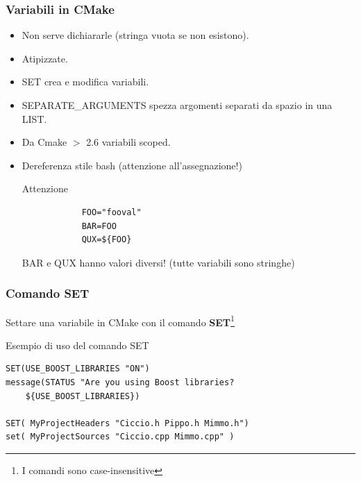 \documentclass[10pt] {beamer}
\begin{document}
\begin{frame}[fragile]
	\frametitle{Variabili in CMake}
	\begin{itemize}
		\item Non serve dichiararle (stringa vuota se non esistono).
		\item Atipizzate.
		\item SET crea e modifica variabili.
		\item SEPARATE\_ARGUMENTS spezza argomenti separati da spazio in una LIST.
		\item Da Cmake $>$ 2.6 variabili scoped.
		\item Dereferenza stile bash (attenzione all'assegnazione!) 
		\begin{alertblock}{Attenzione}
			\begin{small}
			\begin{verbatim}
			FOO="fooval"
			BAR=FOO
			QUX=${FOO}
		\end{verbatim}
		\end{small}
		BAR e QUX hanno valori diversi! (tutte variabili sono stringhe)
		\end{alertblock}
\end{itemize}
\end{frame}


\begin{frame}[fragile]
 \frametitle{Comando SET}
Settare una variabile in CMake con il comando \textbf{SET}\footnote{I comandi sono case-insensitive}
\begin{block}{Esempio di uso del comando SET}
\begin{small}
\begin{verbatim}
SET(USE_BOOST_LIBRARIES "ON")
message(STATUS "Are you using Boost libraries? 
    ${USE_BOOST_LIBRARIES})

SET( MyProjectHeaders "Ciccio.h Pippo.h Mimmo.h")
set( MyProjectSources "Ciccio.cpp Mimmo.cpp" )
\end{verbatim}
\end{small}
\end{block}
\end{frame}


\end{document}
